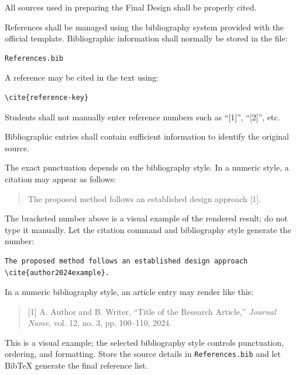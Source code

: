 {

All sources used in preparing the Final Design shall be properly
cited.

References shall be managed using the bibliography system provided
with the official template. Bibliographic information shall normally
be stored in the file:

\begin{verbatim}
References.bib
\end{verbatim}

A reference may be cited in the text using:

\begin{verbatim}
\cite{reference-key}
\end{verbatim}

Students shall not manually enter reference numbers such as
``[1]'', ``[2]'', etc.

Bibliographic entries shall contain sufficient information to
identify the original source.


The exact punctuation depends on the bibliography style. In a
numeric style, a citation may appear as follows:

\begin{quote}
The proposed method follows an established design approach [1].
\end{quote}

The bracketed number above is a visual example of the rendered result;
do not type it manually. Let the citation command and bibliography
style generate the number:

\begin{verbatim}
The proposed method follows an established design approach
\cite{author2024example}.
\end{verbatim}


In a numeric bibliography style, an article entry may render like
this:

\begin{quote}
[1] A. Author and B. Writer, ``Title of the Research Article,''
\textit{Journal Name}, vol. 12, no. 3, pp. 100--110, 2024.
\end{quote}

This is a visual example; the selected bibliography style controls
punctuation, ordering, and formatting. Store the source details in
\verb|References.bib| and let BibTeX generate the final reference list.

}
